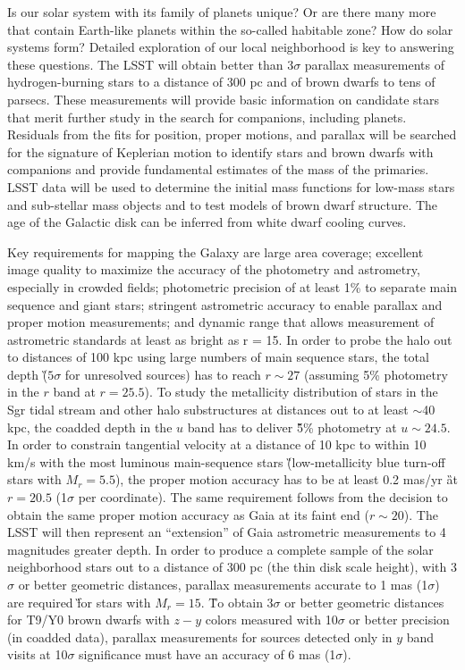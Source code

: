 Is our solar system with its family of planets unique? Or are there many
more that contain Earth-like planets within the so-called habitable zone?
How do solar systems form? Detailed exploration of our local neighborhood
is key to answering these questions.  The LSST will obtain better than
3$\sigma$ parallax measurements of hydrogen-burning stars to a distance of
300 pc and of brown dwarfs to tens of parsecs. These measurements will
provide basic information on candidate stars that merit further study in
the search for companions, including planets.  Residuals from the fits for
position, proper motions, and parallax will be searched for the signature
of Keplerian motion to identify stars and brown dwarfs with companions and
provide fundamental estimates of the mass of the primaries. LSST data will
be used to determine the initial mass functions for low-mass stars and
sub-stellar mass objects and to test models of brown dwarf structure. The
age of the Galactic disk can be inferred from white dwarf cooling curves.

Key requirements for mapping the Galaxy are large area coverage; excellent
image quality to maximize the accuracy of the photometry and astrometry,
especially in crowded fields; photometric precision of at least 1\% to
separate main sequence and giant stars; stringent astrometric accuracy to
enable parallax and proper motion measurements; and dynamic range that
allows measurement of astrometric standards at least as bright as r =
15. In order to probe the halo out to distances of 100 kpc using large numbers of
main sequence stars, the total depth \G{($5\sigma$ for unresolved sources)}
has to reach $r\sim27$ (assuming 5\%
photometry in the $r$ band at $r=25.5$).
To study the metallicity distribution of stars in the Sgr tidal stream and other halo
substructures at distances out to at least $\sim$40 kpc, the coadded depth in
the $u$ band has to deliver \G{5\% photometry at $u\sim24.5$}.
In order to constrain tangential velocity at a distance of 10 kpc to within 10 km/s
with the most luminous main-sequence stars \G{(low-metallicity blue turn-off stars with $M_r=5.5$)},
the proper motion accuracy has to be at least 0.2 mas/yr \G{at $r=20.5$ (1$\sigma$ per coordinate)}.
The same requirement follows from the decision to obtain the same proper motion accuracy
as Gaia at its faint end ($r\sim20$). The LSST will then represent an ``extension'' of Gaia
astrometric measurements to 4 magnitudes greater depth. In order to produce
a complete sample of the solar neighborhood stars out to a distance of 300
pc (the thin disk scale height), with 3$\sigma$ or better geometric
distances, parallax measurements accurate to 1 mas (1$\sigma$) are required
\G{for stars with $M_r=15$}.
\G{To obtain 3$\sigma$ or better geometric distances for T9/Y0 brown dwarfs with
$z-y$ colors measured with 10$\sigma$ or better precision (in coadded data),
parallax  measurements for sources detected only in $y$ band visits at 10$\sigma$
significance must have an accuracy of 6 mas (1$\sigma$). }

